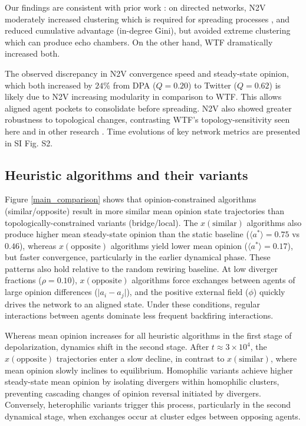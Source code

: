 \documentclass[unnumsec,webpdf,contemporary,large]{oup-authoring-template}%
\theoremstyle{thmstyleone}%
\theoremstyle{thmstyletwo}%
\theoremstyle{thmstylethree}%
\begin{document}
Our findings are consistent with prior work \cite{ferrara_link_2022}: on directed networks, N2V moderately increased clustering which is required for spreading processes \citep{everall_pareto_2025}, and reduced cumulative advantage (in-degree Gini), but avoided extreme clustering which can produce echo chambers. On the other hand, WTF dramatically increased both.

The observed discrepancy in N2V convergence speed and steady-state opinion, which both increased by $24\%$ from DPA ($Q=0.20$) to Twitter ($Q=0.62$) is likely due to N2V increasing modularity in comparison to WTF. This allows aligned agent pockets to consolidate before spreading. N2V also showed greater robustness to topological changes, contrasting WTF's topology-sensitivity seen here and in other research \cite{espin-noboa_inequality_2022}. Time evolutions of key network metrics are presented in SI Fig. S2.


\subsection{Heuristic algorithms and their variants}\label{sec:heuristic}
Figure \ref{main_comparison} shows that opinion-constrained algorithms (similar/opposite) result in more similar mean opinion state trajectories than topologically-constrained variants (bridge/local). The $x(\text{similar})$ algorithms also produce higher mean steady-state opinion than the static baseline ($\langle a^* \rangle  = 0.75$ vs $0.46$), whereas $x(\text{opposite})$ algorithms yield lower mean opinion ($\langle a^* \rangle = 0.17$), but faster convergence, particularly in the earlier dynamical phase. These patterns also hold relative to the random rewiring baseline. At low diverger fractions ($\rho = 0.10$),  $x(\text{opposite})$ algorithms force exchanges between agents of large opinion differences ($\lvert a_i - a_j \rvert$), and the positive external field ($\phi$) quickly drives the network to an aligned state. Under these conditions, regular interactions between agents dominate less frequent backfiring interactions.

Whereas mean opinion increases for all heuristic algorithms in the first stage of depolarization, dynamics shift in the second stage. After $t \approx 3 \times10^4$, the $x(\text{opposite})$ trajectories enter a slow decline, in contrast to $x(\text{similar})$, where mean opinion slowly inclines to equilibrium. Homophilic variants achieve higher steady-state mean opinion by isolating divergers within homophilic clusters, preventing cascading changes of opinion reversal initiated by divergers. Conversely, heterophilic variants trigger this process, particularly in the second dynamical stage, when exchanges occur at cluster edges between opposing agents.
\end{document}
